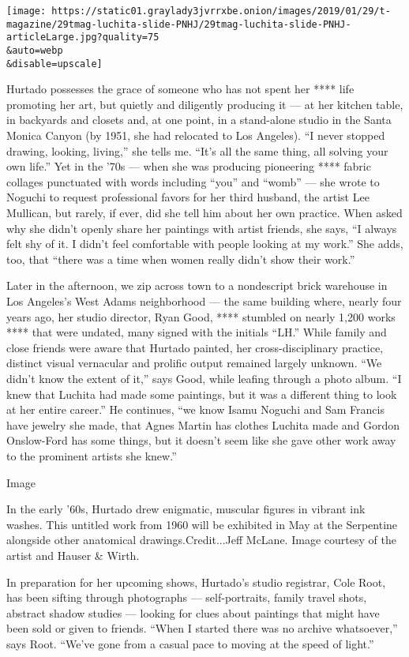 \texttt{[image: https://static01.graylady3jvrrxbe.onion/images/2019/01/29/t-magazine/29tmag-luchita-slide-PNHJ/29tmag-luchita-slide-PNHJ-articleLarge.jpg?quality=75\\\&auto=webp\\\&disable=upscale]}

Hurtado possesses the grace of someone who has not spent her **** life
promoting her art, but quietly and diligently producing it --- at her
kitchen table, in backyards and closets and, at one point, in a
stand-alone studio in the Santa Monica Canyon (by 1951, she had
relocated to Los Angeles). ``I never stopped drawing, looking, living,''
she tells me. ``It's all the same thing, all solving your own life.''
Yet in the '70s --- when she was producing pioneering **** fabric
collages punctuated with words including ``you'' and ``womb'' --- she
wrote to Noguchi to request professional favors for her third husband,
the artist Lee Mullican, but rarely, if ever, did she tell him about her
own practice. When asked why she didn't openly share her paintings with
artist friends, she says, ``I always felt shy of it. I didn't feel
comfortable with people looking at my work.'' She adds, too, that
``there was a time when women really didn't show their work.''

Later in the afternoon, we zip across town to a nondescript brick
warehouse in Los Angeles's West Adams neighborhood --- the same building
where, nearly four years ago, her studio director, Ryan Good, ****
stumbled on nearly 1,200 works **** that were undated, many signed with
the initials ``LH.'' While family and close friends were aware that
Hurtado painted, her cross-disciplinary practice, distinct visual
vernacular and prolific output remained largely unknown. ``We didn't
know the extent of it,'' says Good, while leafing through a photo album.
``I knew that Luchita had made some paintings, but it was a different
thing to look at her entire career.'' He continues, ``we know Isamu
Noguchi and Sam Francis have jewelry she made, that Agnes Martin has
clothes Luchita made and Gordon Onslow-Ford has some things, but it
doesn't seem like she gave other work away to the prominent artists she
knew.''

Image

In the early '60s, Hurtado drew enigmatic, muscular figures in vibrant
ink washes. This untitled work from 1960 will be exhibited in May at the
Serpentine alongside other anatomical drawings.Credit...Jeff McLane.
Image courtesy of the artist and Hauser \& Wirth.

In preparation for her upcoming shows, Hurtado's studio registrar, Cole
Root, has been sifting through photographs --- self-portraits, family
travel shots, abstract shadow studies --- looking for clues about
paintings that might have been sold or given to friends. ``When I
started there was no archive whatsoever,'' says Root. ``We've gone from
a casual pace to moving at the speed of light.''

